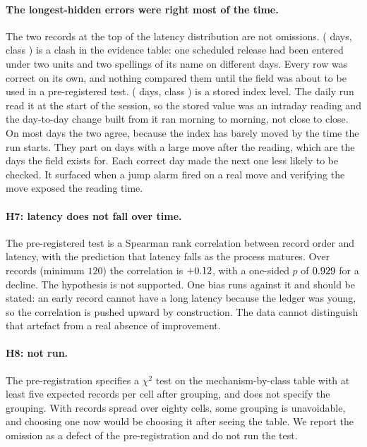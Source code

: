 \documentclass[11pt,a4paper]{article}
\begin{document}
\paragraph{The longest-hidden errors were right most of the time.} The two
records at the top of the latency distribution are not omissions.
\LatMaxRecord{} (\LatMax{} days, class \texttt{\LatMaxClass}) is a clash in
the evidence table: one scheduled release had been entered under two units and
two spellings of its name on different days. Every row was correct on its own,
and nothing compared them until the field was about to be used in a
pre-registered test. \LatSecondRecord{} (\LatSecond{} days, class
\texttt{\LatSecondClass}) is a stored index level. The daily run read it at
the start of the session, so the stored value was an intraday reading and the
day-to-day change built from it ran morning to morning, not close to close. On
most days the two agree, because the index has barely moved by the time the
run starts. They part on days with a large move after the reading, which are
the days the field exists for. Each correct day made the next one less likely
to be checked. It surfaced when a jump alarm fired on a real move and
verifying the move exposed the reading time.

\paragraph{H7: latency does not fall over time.} The pre-registered test is a
Spearman rank correlation between record order and latency, with the
prediction that latency falls as the process matures. Over \SpearN{} records
(minimum $120$) the correlation is $+0.12$, with a one-sided $p$ of
$0.929$ for a decline. The hypothesis is not supported. One bias runs
against it and should be stated: an early record cannot have a long latency
because the ledger was young, so the correlation is pushed upward by
construction. The data cannot distinguish that artefact from a real absence of
improvement.

\paragraph{H8: not run.} The pre-registration specifies a $\chi^{2}$ test on
the mechanism-by-class table with at least five expected records per cell
after grouping, and does not specify the grouping. With \ErrN{} records spread
over eighty cells, some grouping is unavoidable, and choosing one now would be
choosing it after seeing the table. We report the omission as a defect of the
pre-registration and do not run the test.
\end{document}
